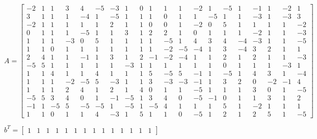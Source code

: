 \documentclass[8pt]{article}
\begin{document}
$ A =
\begin{bmatrix}
 -2  &  1  &  1  &  3  &  4  & -5  & -3  &  1  &  0  &  1  &  1  &  1  & -2  &  1  & -5  &  1  & -1  &  1  & -2  &  1 \\
  3  &  1  &  1  &  1  & -4  &  1  & -5  &  1  &  1  &  1  &  0  &  1  &  1  & -5  &  1  &  1  & -3  &  1  & -3  &  3 \\
 -2  &  1  &  1  &  1  &  1  &  1  &  2  &  1  &  1  &  0  &  0  &  1  & -2  &  0  &  5  &  1  &  1  &  1  &  1  & -2 \\
  0  &  1  &  1  &  1  & -5  &  1  &  1  &  3  &  1  &  2  &  2  &  1  &  0  &  1  &  1  &  1  & -2  &  1  &  1  & -3 \\
  1  &  1  &  1  & -3  &  0  &  5  &  1  &  1  &  1  &  1  & -5  &  1  &  4  &  3  &  4  & -4  & -3  &  1  &  1  & -5 \\
  1  &  1  &  0  &  1  &  1  &  1  &  1  &  1  &  1  &  1  & -2  & -5  & -4  &  1  &  3  & -4  &  3  &  2  &  1  &  1 \\
  2  &  4  &  1  &  1  & -1  &  1  &  3  &  1  &  2  & -1  & -2  & -4  &  1  &  1  &  2  &  1  &  2  &  1  &  1  & -3 \\
 -5  &  5  &  1  &  1  &  1  &  1  &  1  & -3  &  1  &  1  &  1  &  1  &  1  &  1  &  0  &  1  &  1  &  1  & -3  &  1 \\
  1  &  1  &  4  &  1  &  1  &  4  &  1  &  1  &  1  &  5  & -5  &  5  & -1  &  1  & -5  &  1  &  4  &  3  &  1  & -4 \\
  1  &  1  &  1  & -2  & -5  &  5  & -3  &  1  &  1  &  3  & -3  & -3  & -1  &  1  &  3  &  2  &  0  & -2  & -1  &  4 \\
  1  &  1  &  1  &  2  &  4  &  1  &  2  &  1  &  4  &  0  &  1  &  1  & -5  &  1  &  1  &  1  &  3  &  0  &  1  & -5 \\
 -5  &  5  &  3  &  4  &  0  &  1  & -1  & -5  &  1  &  3  &  4  &  0  & -5  & -1  &  0  &  1  &  1  &  3  &  1  &  2 \\
 -1  &  1  & -5  &  5  & -5  & -5  &  1  & -5  &  1  & -5  &  4  &  1  &  1  &  1  &  5  &  1  & -2  &  1  &  1  &  1 \\
  1  &  1  &  0  &  1  &  1  &  4  & -3  &  1  &  5  &  1  &  1  &  0  & -5  &  1  &  2  &  1  &  2  &  5  &  1  & -5 
\end{bmatrix}
$


$ b^T =
\begin{bmatrix}
  1  &  1  &  1  &  1  &  1  &  1  &  1  &  1  &  1  &  1  &  1  &  1  &  1  &  1 
\end{bmatrix}
$
\end{document}
